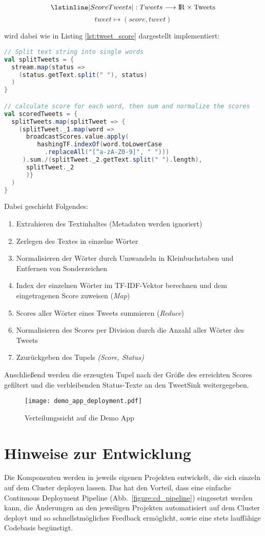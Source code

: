 \[\lstinline|ScoreTweets|: Tweets \longrightarrow \rm I\!R \times Tweets\]
\[tweet \mapsto (score, tweet)\]

wird dabei wie in Listing \ref{lst:tweet_score} dargestellt implementiert:

\begin{lstlisting}[language=Scala,caption={Bewertung von Tweets},label={lst:tweet_score}]
// Split text string into single words
val splitTweets = {
  stream.map(status =>
    (status.getText.split(" "), status)
  )
}

// calculate score for each word, then sum and normalize the scores
val scoredTweets = {
  splitTweets.map(splitTweet => {
    (splitTweet._1.map(word =>
      broadcastScores.value.apply(
         hashingTF.indexOf(word.toLowerCase
           .replaceAll("[^a-zA-Z0-9]", " ")))
     ).sum./(splitTweet._2.getText.split(" ").length),
      splitTweet._2
      )}
  )
}
\end{lstlisting}

Dabei geschieht Folgendes:
\begin{enumerate}
	\item Extrahieren des Textinhaltes (Metadaten werden ignoriert)
	\item Zerlegen des Textes in einzelne Wörter
	\item Normalisieren der Wörter durch Umwandeln in Kleinbuchstaben und Entfernen von Sonderzeichen
	\item Index der einzelnen Wörter im TF-IDF-Vektor berechnen und dem eingetragenen Score zuweisen (\textit{Map})
	\item Scores aller Wörter eines Tweets summieren (\textit{Reduce})
	\item Normalisieren des Scores per Division durch die Anzahl aller Wörter des Tweets
	\item Zzurückgeben des Tupels \textit{(Score, Status)}
\end{enumerate}

Anschließend werden die erzeugten Tupel nach der Größe des erreichten Scores gefiltert und die verbleibenden Status-Texte an den TweetSink weitergegeben.\\

\begin{figure}[ht!]
	\centering
  \texttt{[image: demo\_app\_deployment.pdf]}
	\caption{Verteilungssicht auf die Demo App}
	\label{figure:demo_app_verteilung}
\end{figure}

\section{Hinweise zur Entwicklung}
Die Komponenten werden in jeweils eigenen Projekten entwickelt, die sich einzeln auf dem Cluster deployen lassen. Das hat den Vorteil, dass eine einfache Continuous Deployment Pipeline (Abb.~\ref{figure:cd_pipeline}) eingesetzt werden kann, die Änderungen an den jeweiligen Projekten automatisiert auf dem Cluster deployt und so schnellstmögliches Feedback ermöglicht, sowie eine stets lauffähige Codebasis begünstigt.\\

